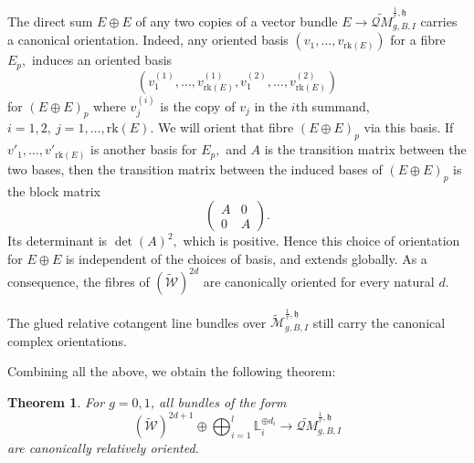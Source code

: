 \documentclass[11pt,a4paper]{article}
\newtheorem{thm}[dummy]{Theorem}
\theoremstyle{definition}
\theoremstyle{remark}
\numberwithin{equation}{section}
\def\h{{\mathfrak h}}
\begin{document}
    The direct sum $E\oplus E$ of any two copies of a vector bundle $E\to\widetilde{\mathcal QM}^{\frac{1}{r},\h}_{g,B,I}$ carries a canonical orientation. Indeed, any oriented basis $(v_1,\ldots,v_{\text{rk}(E)})$ for a fibre $E_p,$ induces an oriented basis
    \[
    (v^{(1)}_1,\ldots,v^{(1)}_{\text{rk}(E)},
    v^{(2)}_1,\ldots,v^{(2)}_{\text{rk}(E)})
    \] for $(E\oplus E)_p$
    where $v_j^{(i)}$ is the copy of $v_j$ in the $i$th summand, $i=1,2,~j=1,\ldots,\text{rk}(E).$ We will orient that fibre $(E\oplus E)_p$ via this basis.
    If $v'_1,\ldots,v'_{\text{rk}(E)}$ is another basis for $E_p,$ and $A$ is the transition matrix between the two bases, then the transition matrix between the induced bases of $(E\oplus E)_p$ is the block matrix
    \[\begin{pmatrix}
A &0\\0 &A\end{pmatrix}.\]Its determinant is $\det(A)^2,$ which is positive. Hence this choice of orientation for $E\oplus E$ is independent of the choices of basis, and extends globally. 
As a consequence, the fibres of $(\widetilde{{\mathcal{W}}})^{2d}$ are canonically oriented for every natural $d.$
    
    The glued relative cotangent line bundles over $\widetilde{\mathcal M}^{\frac{1}{r},\h}_{g,B,I}$ still carry the canonical complex orientations. 

    
    
    Combining all the above, we obtain the following theorem:
    \begin{thm}\label{thm:main_or}
      For $g=0,1$, all bundles of the form
    \[(\widetilde{{\mathcal{W}}})^{2d+1}\oplus\bigoplus_{i=1}^l\mathbb{L}_i^{\oplus d_i}\to \widetilde{\mathcal QM}^{\frac{1}{r},\h}_{g,B,I}\]are canonically relatively oriented.  
    \end{thm}



  





\end{document}
